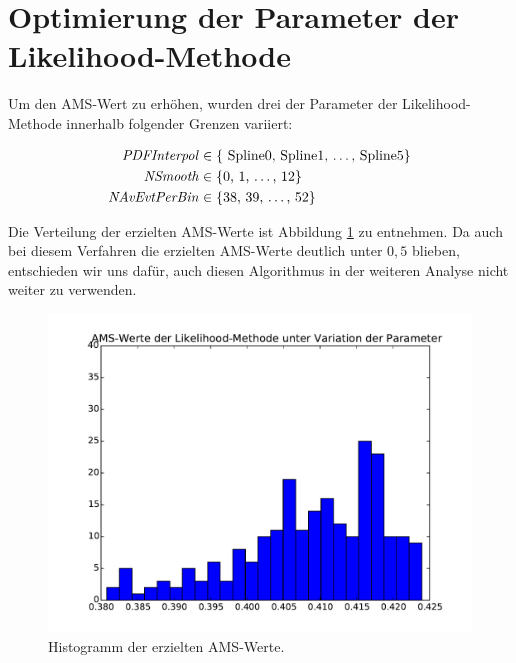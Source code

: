 \section{Optimierung der Parameter der Likelihood-Methode}
Um den AMS-Wert zu erhöhen, wurden drei der Parameter der Likelihood-Methode innerhalb folgender Grenzen variiert:

\begin{equation}
\begin{split}
\mbox{\textit{PDFInterpol}} &\in \{ \mbox{ Spline0,  Spline1, \ldots, Spline5}  \}  \\
 \mbox{\textit{NSmooth}} &\in \{ \mbox{0, 1, \ldots, 12} \} \\
  \mbox{\textit{NAvEvtPerBin}} &\in \{ \mbox{38, 39, \ldots, 52} \} \\
\end{split}
\end{equation}

Die Verteilung der erzielten AMS-Werte ist  Abbildung \ref{fig:likelihood_hist} zu entnehmen.
Da auch bei diesem Verfahren die erzielten AMS-Werte deutlich unter $0,5$ blieben, entschieden wir uns dafür, auch diesen Algorithmus in der weiteren Analyse nicht weiter zu verwenden.


\begin{figure}[htp]
\begin{center}
  \includegraphics[width=0.7\linewidth]{sections/parameter_optimization_likelihood/likelihood_AMS_hist.pdf}
 \caption[Histogramm der erzielten AMS-Werte]{Histogramm der erzielten AMS-Werte.}
\label{fig:likelihood_hist}
\end{center}
\end{figure}